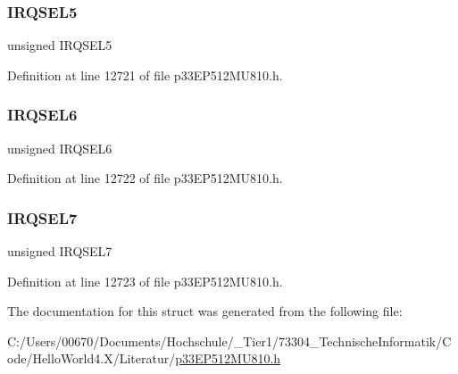 \subsubsection{\texorpdfstring{I\+R\+Q\+S\+E\+L5}{IRQSEL5}}
{\footnotesize\ttfamily unsigned I\+R\+Q\+S\+E\+L5}



Definition at line 12721 of file p33\+E\+P512\+M\+U810.\+h.

\mbox{\label{structtag_d_m_a1_r_e_q_b_i_t_s_ace52408ef8c29561f3c56a3fbcbc8217}} 
\subsubsection{\texorpdfstring{I\+R\+Q\+S\+E\+L6}{IRQSEL6}}
{\footnotesize\ttfamily unsigned I\+R\+Q\+S\+E\+L6}



Definition at line 12722 of file p33\+E\+P512\+M\+U810.\+h.

\mbox{\label{structtag_d_m_a1_r_e_q_b_i_t_s_acce7dedecdf1f53cdbead3edf7c5d53a}} 
\subsubsection{\texorpdfstring{I\+R\+Q\+S\+E\+L7}{IRQSEL7}}
{\footnotesize\ttfamily unsigned I\+R\+Q\+S\+E\+L7}



Definition at line 12723 of file p33\+E\+P512\+M\+U810.\+h.



The documentation for this struct was generated from the following file\+:\begin{DoxyCompactItemize}
\item 
C\+:/\+Users/00670/\+Documents/\+Hochschule/\+\_\+\+Tier1/73304\+\_\+\+Technische\+Informatik/\+Code/\+Hello\+World4.\+X/\+Literatur/\hyperlink{p33_e_p512_m_u810_8h}{p33\+E\+P512\+M\+U810.\+h}\end{DoxyCompactItemize}
